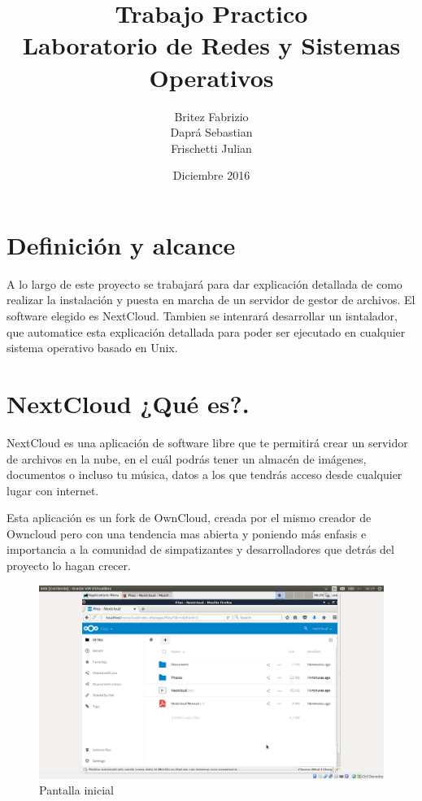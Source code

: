 \documentclass[11pt]{article}
\title{\textbf{Trabajo Practico\\
Laboratorio de Redes y Sistemas Operativos}}
\author{Britez Fabrizio\\Daprá Sebastian\\Frischetti Julian}
\date{Diciembre 2016}
\begin{document}
\maketitle

\tableofcontents{}


\clearpage

\section{Definición y alcance}
A lo largo de este proyecto se trabajará para dar explicación detallada de como realizar la instalación y puesta en marcha de un servidor de gestor de archivos. El software elegido es NextCloud.
Tambien se intenrará desarrollar un isntalador, que automatice esta explicación detallada para poder ser ejecutado en cualquier sistema operativo basado en Unix.

\section{NextCloud ¿Qué es?.}

NextCloud es una aplicación de software libre que te permitirá crear un servidor de archivos en la nube, en el cuál podrás tener un almacén de imágenes, documentos o incluso tu música, datos a los que tendrás acceso desde cualquier lugar con internet.

Esta aplicación es un fork de OwnCloud, creada por el mismo creador de Owncloud pero con una tendencia mas abierta y poniendo más enfasis e importancia a la comunidad de simpatizantes y desarrolladores que detrás del proyecto lo hagan crecer. 
\begin{figure}[htp]
\centering
\includegraphics[scale=0.30]{nexcloud2.png}
\caption{Pantalla inicial}
\label{}
\end{figure}
\end{document}
